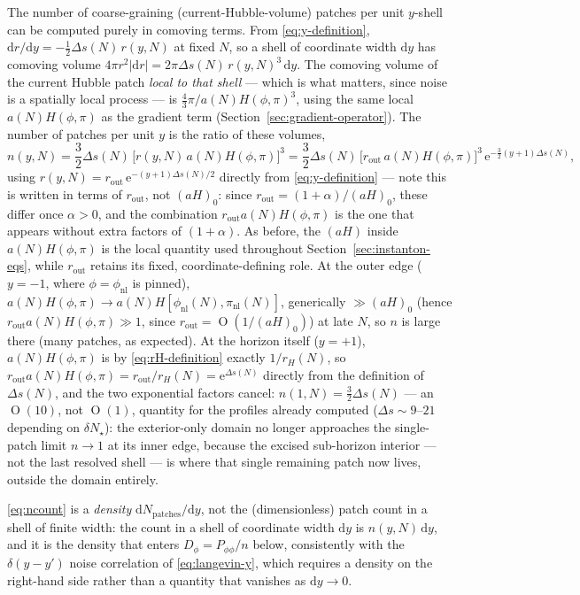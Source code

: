 \documentclass[a4paper,11pt]{article}
\newcommand{\semibold}[1]{{\fontseries{b}\selectfont{#1}}}
\DeclareMathOperator{\Or}{O}
\renewcommand{\d}{\mathrm{d}}
\newcommand{\e}[1]{\mathrm{e}^{{#1}}}
\newenvironment{panel}{\begin{tcolorbox}[enhanced,breakable,colback=gray!10,colframe=gray!30]\small}{\end{tcolorbox}}
\newcommand{\Ny}{N}                          %
\newcommand{\dNstar}{\delta N_\star}         %
\newcommand{\Hub}{H}                         %
\newcommand{\sfactor}{a}                     %
\newcommand{\atloc}{(\field,\mom)}           %
\newcommand{\field}{\phi}                    %
\newcommand{\mom}{\pi}                       %
\newcommand{\phinl}{\field_{\mathrm{nl}}}    %
\newcommand{\pinl}{\mom_{\mathrm{nl}}}       %
\newcommand{\rad}{r}                         %
\newcommand{\yco}{y}                         %
\newcommand{\rout}{\rad_{\mathrm{out}}}      %
\newcommand{\aHo}{(\sfactor \Hub)_0}         %
\newcommand{\aH}[1][]{(\sfactor \Hub)#1}     %
\newcommand{\aHloc}{\sfactor(\Ny)\Hub\atloc} %
\newcommand{\rH}{\rad_H}                     %
\newcommand{\Deltas}{\Delta s}                %
\newcommand{\Dnoise}[1]{D_{#1}}              %
\newcommand{\Pspec}[1]{P_{#1}}               %
\newcommand{\ncount}{n}                      %
\begin{document}
The number of coarse-graining (current-Hubble-volume) patches per unit
$\yco$-shell can be computed purely in comoving terms. From
\eqref{eq:y-definition}, $\d\rad/\d\yco = -\tfrac12\Deltas(\Ny)\,\rad(\yco,\Ny)$
at fixed $\Ny$, so a shell of coordinate width $\d\yco$ has comoving volume
$4\pi\rad^2|\d\rad| = 2\pi\Deltas(\Ny)\,\rad(\yco,\Ny)^3\,\d\yco$. The
comoving volume of the current Hubble patch \emph{local to that shell} ---
which is what matters, since noise is a spatially local process --- is
$\tfrac43\pi/\aHloc^3$, using the same local $\aHloc$ as the gradient term
(Section~\ref{sec:gradient-operator}). The number of patches per unit
$\yco$ is the ratio of these volumes,
\begin{equation}
    \ncount(\yco,\Ny)
    =
    \frac32\Deltas(\Ny)\,\big[\rad(\yco,\Ny)\,\aHloc\big]^3
    =
    \frac32\Deltas(\Ny)\,\big[\rout\,\aHloc\big]^3 \, \e{-\frac32(\yco+1)\Deltas(\Ny)} ,
    \label{eq:ncount}
\end{equation}
using $\rad(\yco,\Ny) = \rout\,\e{-(\yco+1)\Deltas(\Ny)/2}$ directly from
\eqref{eq:y-definition} --- note this is written in terms of $\rout$, not
$\aHo$: since $\rout=(1+\alpha)/\aHo$, these differ once $\alpha>0$, and
the combination $\rout\aHloc$ is the one that appears without extra
factors of $(1+\alpha)$. As before, the $\aH$ inside $\aHloc$ is the local
quantity used throughout Section~\ref{sec:instanton-eqs}, while $\rout$
retains its fixed, coordinate-defining role. At the outer edge
($\yco=-1$, where $\field=\phinl$ is pinned), $\aHloc\to a(\Ny)\Hub[\phinl(\Ny),\pinl(\Ny)]$,
generically $\gg\aHo$ (hence $\rout\aHloc\gg1$, since $\rout=\Or(1/\aHo)$)
at late $\Ny$, so $\ncount$ is large there (many patches, as expected). At
the horizon itself ($\yco=+1$), $\aHloc$ is by \eqref{eq:rH-definition}
exactly $1/\rH(\Ny)$, so $\rout\aHloc = \rout/\rH(\Ny) = \e{\Deltas(\Ny)}$
directly from the definition of $\Deltas(\Ny)$, and the two exponential
factors cancel: $\ncount(1,\Ny) = \tfrac32\Deltas(\Ny)$
--- an $\Or(10)$, not $\Or(1)$, quantity for the profiles already computed
($\Deltas\sim9$--$21$ depending on $\dNstar$): the exterior-only domain no
longer approaches the single-patch limit $\ncount\to1$ at its inner edge,
because the excised sub-horizon interior --- not the last resolved shell
--- is where that single remaining patch now lives, outside the domain
entirely.

\begin{panel}
\semibold{$\ncount(\yco,\Ny)$ as a density, not a shell count.}
\eqref{eq:ncount} is a \emph{density} $\d N_{\mathrm{patches}}/\d\yco$, not
the (dimensionless) patch count in a shell of finite width: the count in a
shell of coordinate width $\d\yco$ is $\ncount(\yco,\Ny)\,\d\yco$, and it
is the density that enters $\Dnoise{\field}=\Pspec{\field\field}/\ncount$
below, consistently with the $\delta(\yco-\yco')$ noise correlation of
\eqref{eq:langevin-y}, which requires a density on the right-hand side
rather than a quantity that vanishes as $\d\yco\to0$.
\end{panel}
\end{document}
